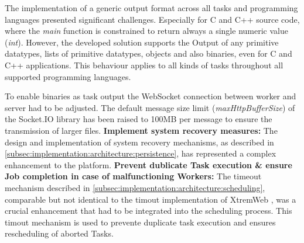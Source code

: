 The implementation of a generic output format across all tasks and programming languages presented significant challenges. Especially for C and C++ source code, where the \emph{main} function is constrained to return always a single numeric value (\emph{int}). However, the developed solution supports the Output of any primitive datatypes, lists of primitive datatypes, objects and also binaries, even for C and C++ applications. This behaviour applies to all kinds of tasks throughout all supported programming languages.

To enable binaries as task output the WebSocket connection between worker and server had to be adjusted. The default message size limit (\emph{maxHttpBufferSize}) of the Socket.IO library has been raised to 100MB per message to ensure the transmission of larger files.
\newline
\newline
\textbf{Implement system recovery measures:}
\newline
The design and implementation of system recovery mechanisms, as described in \autoref{subsec:implementation:architecture:persistence}, has represented a complex enhancement to the platform.
\newline
\newline
\textbf{Prevent dublicate Task execution \& ensure Job completion in case of malfunctioning Workers:}
\newline
The timeout mechanism described in \autoref{subsec:implementation:architecture:scheduling}, comparable but not identical to the timout implementation of XtremWeb \cite{relatedwork:xtremweb}, was a crucial enhancement that had to be integrated into the scheduling process. This timout mechanism is used to prevente duplicate task execution and ensures rescheduling of aborted Tasks.